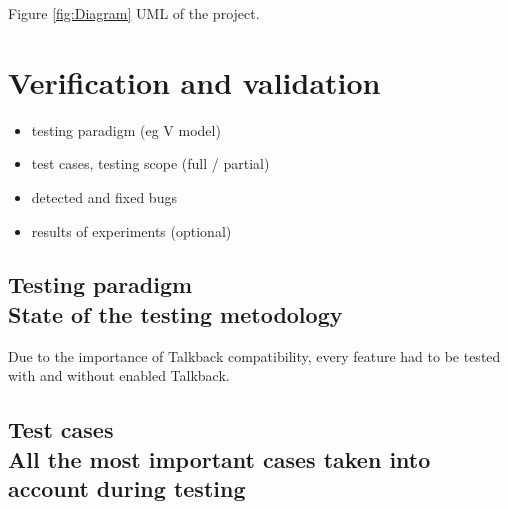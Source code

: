 \documentclass[a4paper,twoside,12pt]{book}
\begin{document}
Figure \ref{fig:Diagram} UML of the project.

\chapter{Verification and validation}
\begin{itemize}
\item testing paradigm (eg V model)
\item test cases, testing scope (full / partial)
\item detected and fixed bugs
\item results of experiments (optional)
\end{itemize}

 \clearpage

\section{Testing paradigm\\ {\large State of the testing metodology }}
 
\par Due to the importance of Talkback compatibility, every feature had to be tested with and without enabled Talkback.

\section{Test cases\\ {\large All the most important cases taken into account during testing }}
\end{document}
